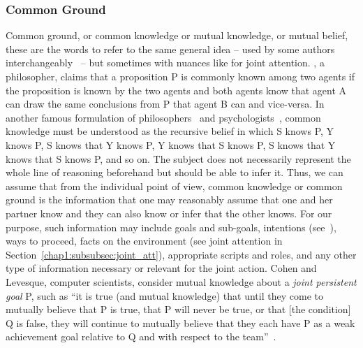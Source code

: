 \documentclass[a4paper,11pt,twoside]{StyleThese}
\begin{document}
\subsubsection{Common Ground}\label{chap1:subsubsec:common_g}
Common ground, or common knowledge or mutual knowledge, or mutual belief, these are the words to refer to the same general idea -- used by some authors interchangeably~\citep{clark_1992_arenas, clark_1996_using} -- but sometimes with nuances like for joint attention. \cite{lewis_1969_convention}, a philosopher, claims that a proposition P is commonly known among two agents if the proposition is known by the two agents and both agents know that agent A can draw the same conclusions from P that agent B can and vice-versa. In another famous formulation of philosophers~\citep{schiffer_1972_meaning} and psychologists~\citep{thomas_2014_psychology}, common knowledge must be understood as the recursive belief in which S knows P, Y knows P, S knows that Y knows P, Y knows that S knows P, S knows that Y knows that S knows P, and so on. The subject does not necessarily represent the whole line of reasoning beforehand but should be able to infer it. Thus, we can assume that from the individual point of view, common knowledge or common ground is the information that one may reasonably assume that one and her partner know and they can also know or infer that the other knows. For our purpose, such information may include goals and sub-goals, intentions (see~\citep{bratman_1992_coop}), ways to proceed, facts on the environment (see joint attention in Section~\ref{chap1:subsubsec:joint_att}), appropriate scripts and roles, and any other type of information necessary or relevant for the joint action. Cohen and Levesque, computer scientists, consider mutual knowledge about a \emph{joint persistent goal} P, such as ``it is true (and mutual knowledge) that until they come to mutually believe that P is true, that P will never be true, or that [the condition] Q is false, they will continue to mutually believe that they each have P as a weak achievement goal relative to Q and with respect to the team''~\citep[p.~499]{cohen_1991_teamwork}.
\end{document}
